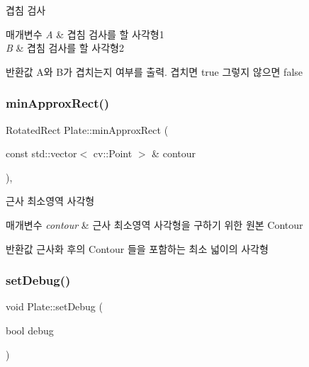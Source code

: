 겹침 검사 


\begin{DoxyParams}{매개변수}
{\em A} & 겹침 검사를 할 사각형1 \\
\hline
{\em B} & 겹침 검사를 할 사각형2 \\
\hline
\end{DoxyParams}
\begin{DoxyReturn}{반환값}
A와 B가 겹치는지 여부를 출력. 겹치면 true 그렇지 않으면 false 
\end{DoxyReturn}
\mbox{\label{class_plate_a2c048194ebdfbaeede0068dcbefbd4cf}} 
\subsubsection{\texorpdfstring{min\+Approx\+Rect()}{minApproxRect()}}
{\footnotesize\ttfamily Rotated\+Rect Plate\+::min\+Approx\+Rect (\begin{DoxyParamCaption}\item[{const std\+::vector$<$ cv\+::\+Point $>$ \&}]{contour }\end{DoxyParamCaption})\hspace{0.3cm}{\ttfamily [static]}, {\ttfamily [private]}}



근사 최소영역 사각형 


\begin{DoxyParams}{매개변수}
{\em contour} & 근사 최소영역 사각형을 구하기 위한 원본 Contour \\
\hline
\end{DoxyParams}
\begin{DoxyReturn}{반환값}
근사화 후의 Contour 들을 포함하는 최소 넓이의 사각형 
\end{DoxyReturn}
\mbox{\label{class_plate_a4f307c5bc7cf3c5887d704fbeed3fd8a}} 
\subsubsection{\texorpdfstring{set\+Debug()}{setDebug()}}
{\footnotesize\ttfamily void Plate\+::set\+Debug (\begin{DoxyParamCaption}\item[{bool}]{debug }\end{DoxyParamCaption})}



